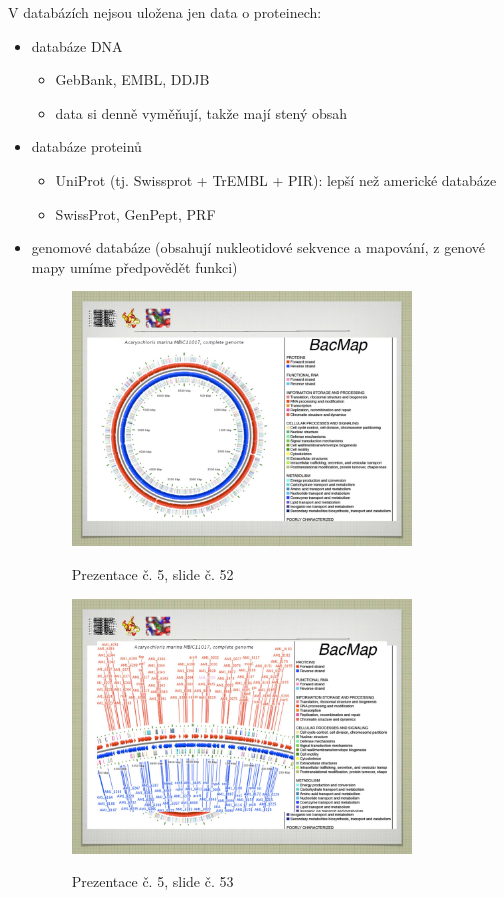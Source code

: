 \documentclass[DIV=8]{scrreprt}
\begin{document}
V databázích nejsou uložena jen data o proteinech:
\begin{itemize}[nosep]
    \item databáze DNA
\begin{itemize}[nosep]
    \item GebBank, EMBL, DDJB
    \item data si denně vyměňují, takže mají stený obsah
\end{itemize}

    \item databáze proteinů
\begin{itemize}[nosep]
    \item UniProt (tj. Swissprot + TrEMBL + PIR): lepší než americké databáze
    \item SwissProt, GenPept, PRF
\end{itemize}

    \item genomové databáze (obsahují nukleotidové sekvence a mapování, z genové mapy umíme předpovědět funkci) \begin{figure}
    \caption{Prezentace č. 5, slide č. 52}
    \includegraphics[width=0.85\textwidth]{slides-5/slide-52.jpg}
    \centering
    \label{slides-5-slide-52}
\end{figure}
\begin{figure}
    \caption{Prezentace č. 5, slide č. 53}
    \includegraphics[width=0.85\textwidth]{slides-5/slide-53.jpg}
    \centering
    \label{slides-5-slide-53}
\end{figure}


\end{itemize}
\end{document}
